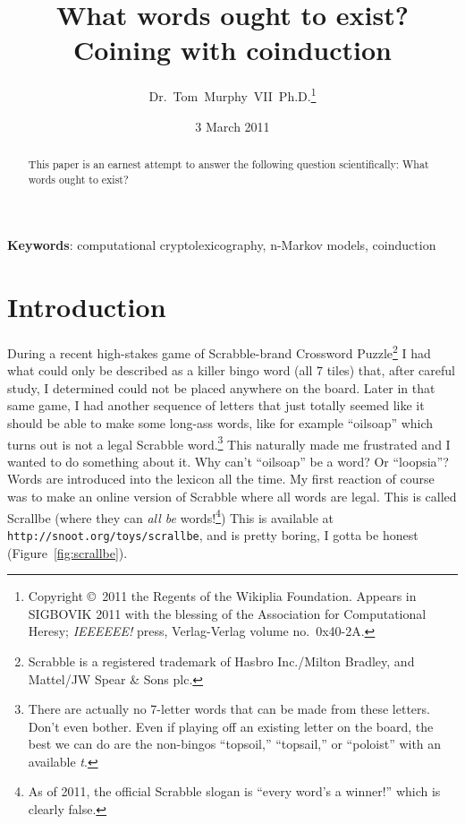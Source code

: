 \documentclass[twocolumn]{article}
\begin{document}
 

\title{What words ought to exist? \\
       {\normalsize Coining with coinduction}}
\author{Dr.~Tom~Murphy~VII~Ph.D.\thanks{
Copyright \copyright\ 2011 the Regents of the Wikiplia
Foundation. Appears in SIGBOVIK 2011 with the blessing of the
Association for Computational Heresy; {\em IEEEEEE!} press,
Verlag-Verlag volume no.~0x40-2A.
}
}


\renewcommand\>{$>$}
\newcommand\<{$<$}

\date{3 March 2011}

\maketitle

\begin{abstract}
This paper is an earnest attempt to answer the following question
scientifically: What words ought to exist?
\end{abstract}

\vspace{1em}
{\noindent \small {\bf Keywords}:
 computational cryptolexicography, n-Markov models, coinduction
}

\section*{Introduction}
During a recent high-stakes game of Scrabble-brand Crossword
Puzzle\footnote{Scrabble is a registered trademark of Hasbro
  Inc./Milton Bradley, and Mattel/JW Spear \& Sons plc.} I had what
could only be described as a killer bingo word (all 7 tiles) that,
after careful study, I determined could not be placed anywhere on the
board. Later in that same game, I had another sequence of letters that
just totally seemed like it should be able to make some long-ass
words, like for example ``oilsoap'' which turns out is not a legal
Scrabble word.\!\footnote{There are actually no 7-letter words that
  can be made from these letters. Don't even bother. Even if playing
  off an existing letter on the board, the best we can do are the
  non-bingos ``topsoil,'' ``topsail,'' or ``poloist'' with an
  available {\it t}.} This naturally made me frustrated and I wanted
to do something about it. Why can't ``oilsoap'' be a word? Or
``loopsia''? Words are introduced into the lexicon all the time. My
first reaction of course was to make an online version of Scrabble
where all words are legal. This is called Scrallbe (where they can
{\it all be} words!\footnote{As of 2011, the official Scrabble slogan
  is ``every word's a winner!'' which is clearly false.}) This is
available at {\tt http://snoot.org/toys/scrallbe}, and is pretty
boring, I gotta be honest (Figure~\ref{fig:scrallbe}).
\end{document}
